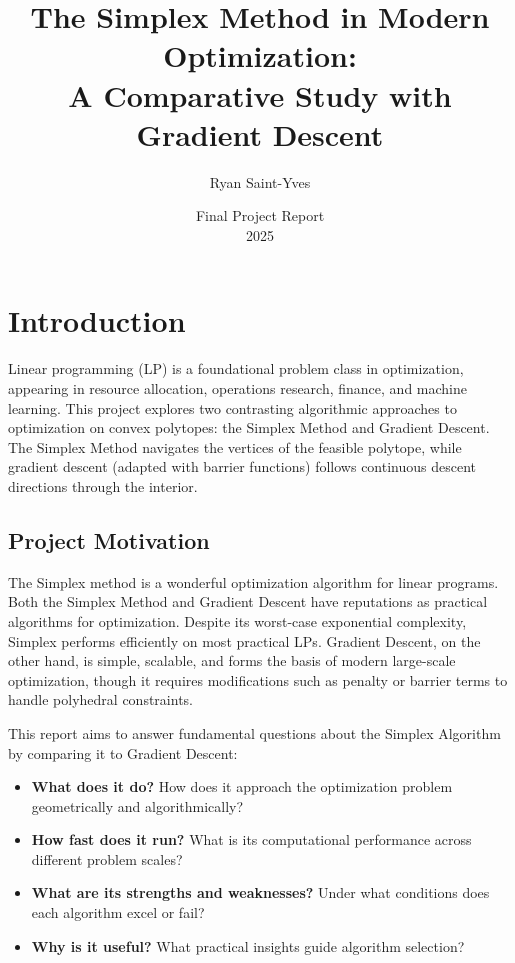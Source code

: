 \documentclass[11pt]{article}
\title{The Simplex Method in Modern Optimization: \\A Comparative Study with Gradient Descent}
\author{Ryan Saint-Yves}
\date{Final Project Report \\ 2025}
\begin{document}
\maketitle

\section{Introduction}

Linear programming (LP) is a foundational problem class in optimization, appearing in resource allocation, operations research, finance, and machine learning. This project explores two contrasting algorithmic approaches to optimization on convex polytopes: the Simplex Method and Gradient Descent. The Simplex Method navigates the vertices of the feasible polytope, while gradient descent (adapted with barrier functions) follows continuous descent directions through the interior.


\subsection{Project Motivation}
The Simplex method is a wonderful optimization algorithm for linear programs. Both the Simplex Method and Gradient Descent have reputations as practical algorithms for optimization. Despite its worst-case exponential complexity, Simplex performs efficiently on most practical LPs. Gradient Descent, on the other hand, is simple, scalable, and forms the basis of modern large-scale optimization, though it requires modifications such as penalty or barrier terms to handle polyhedral constraints.

This report aims to answer fundamental questions about the Simplex Algorithm by comparing it to Gradient Descent:
\begin{itemize}
    \item \textbf{What does it do?} How does it approach the optimization problem geometrically and algorithmically?
    \item \textbf{How fast does it run?} What is its computational performance across different problem scales?
    \item \textbf{What are its strengths and weaknesses?} Under what conditions does each algorithm excel or fail?
    \item \textbf{Why is it useful?} What practical insights guide algorithm selection?
\end{itemize}
\end{document}

